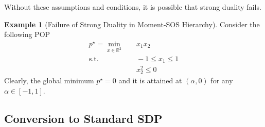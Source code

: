 \documentclass[
]{book}
\theoremstyle{definition}
\theoremstyle{definition}
\newtheorem{example}{Example}[chapter]
\theoremstyle{definition}
\theoremstyle{definition}
\theoremstyle{remark}
\begin{document}
Without these assumptions and conditions, it is possible that strong duality fails.

\begin{example}[Failure of Strong Duality in Moment-SOS Hierarchy]
\protect\hypertarget{exm:FailureStrongDualityMomentSOS}{}\label{exm:FailureStrongDualityMomentSOS}Consider the following POP
\begin{equation}
\begin{split}
p^\star = \min_{x \in \mathbb{R}^{2}} & \quad x_1 x_2 \\
\mathrm{s.t.}& \quad -1 \leq x_1 \leq 1 \\
& \quad x_2^2 \leq 0
\end{split}
\end{equation}
Clearly, the global minimum \(p^\star = 0\) and it is attained at \((\alpha,0)\) for any \(\alpha \in [-1,1]\).
\end{example}

\subsection{Conversion to Standard SDP}\label{conversion-to-standard-sdp}

  
\end{document}
